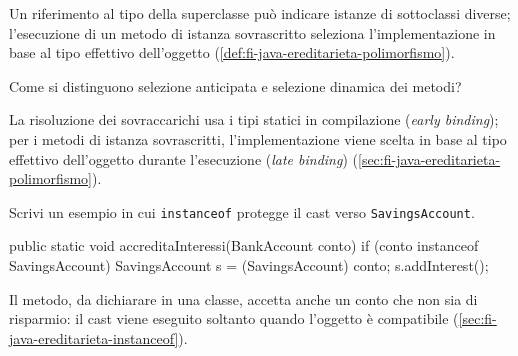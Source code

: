 Un riferimento al tipo della superclasse può indicare istanze di sottoclassi
diverse; l’esecuzione di un metodo di istanza sovrascritto seleziona
l’implementazione in base al tipo effettivo dell’oggetto
(\cref{def:fi-java-ereditarieta-polimorfismo}).

\begin{exercise}
\label{ex:fi-esercizi-java-ereditarieta-binding}
Come si distinguono selezione anticipata e selezione dinamica dei metodi?
\end{exercise}

La risoluzione dei sovraccarichi usa i tipi statici in compilazione
(\emph{early binding}); per i metodi di istanza sovrascritti,
l'implementazione viene scelta in base al tipo effettivo dell'oggetto
durante l'esecuzione (\emph{late binding})
(\cref{sec:fi-java-ereditarieta-polimorfismo}).

\begin{exercise}
\label{ex:fi-esercizi-java-ereditarieta-cast-sicuro}
Scrivi un esempio in cui \texttt{instanceof} protegge il cast verso
\texttt{SavingsAccount}.
\end{exercise}

\begin{unipdcode}[language=Java]
public static void accreditaInteressi(BankAccount conto) {
    if (conto instanceof SavingsAccount) {
        SavingsAccount s = (SavingsAccount) conto;
        s.addInterest();
    }
}
\end{unipdcode}
Il metodo, da dichiarare in una classe, accetta anche un conto che non
sia di risparmio: il cast viene eseguito soltanto quando l'oggetto è
compatibile (\cref{sec:fi-java-ereditarieta-instanceof}).
